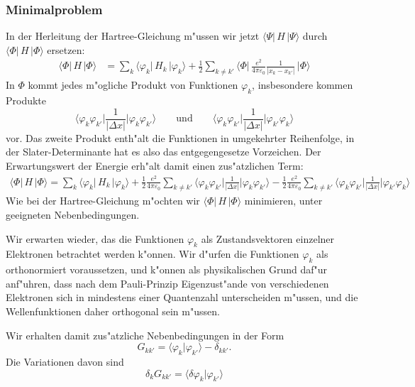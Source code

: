 \subsubsection{Minimalproblem}
In der Herleitung der Hartree-Gleichung m"ussen wir jetzt
$\langle\Psi|\,H\,|\Psi\rangle$ 
durch
$\langle\Phi|\,H\,|\Phi\rangle$ 
ersetzen:
\begin{align*}
\langle\Phi|\,H\,|\Phi\rangle
&=
\sum_k\langle\varphi_k|\,H_k\,|\varphi_k\rangle
+
\frac12
\sum_{k\ne k'}\biggl\langle\Phi\biggl|\,
\frac{e^2}{4\pi\varepsilon_0}
\frac{1}{|x_k-x_{k'}|}
\,\biggr|\Phi\biggr\rangle
\end{align*}
In $\Phi$ kommt jedes m"ogliche Produkt von Funktionen $\varphi_k$,
insbesondere kommen Produkte
\[
\biggl\langle\varphi_k\varphi_{k'}\biggr|
\frac{1}{|\Delta x|}
\biggl|\varphi_k\varphi_{k'}\biggr\rangle
\qquad\text{und}\qquad
\biggl\langle\varphi_k\varphi_{k'}\biggr|
\frac{1}{|\Delta x|}
\biggl|\varphi_{k'}\varphi_k\biggr\rangle
\]
vor.
Das zweite Produkt enth"alt die Funktionen in umgekehrter Reihenfolge,
in der Slater-Deter\-minante hat es also das entgegengesetze Vorzeichen.
Der Erwartungswert der Energie erh"alt damit einen zus"atzlichen Term:
\begin{align*}
\langle\Phi|\,H\,|\Phi\rangle
=
\sum_k\langle\varphi_k|\,H_k\,|\varphi_k\rangle
+
\frac12
\frac{e^2}{4\pi\varepsilon_0}
\sum_{k\ne k'}
\biggl\langle\varphi_k\varphi_{k'}\biggr|
\frac{1}{|\Delta x|}
\biggl|\varphi_k\varphi_{k'}\biggr\rangle
-
\frac12
\frac{e^2}{4\pi\varepsilon_0}
\sum_{k\ne k'}
\biggl\langle\varphi_k\varphi_{k'}\biggr|
\frac{1}{|\Delta x|}
\biggl|\varphi_{k'}\varphi_k\biggr\rangle
\end{align*}
Wie bei der Hartree-Gleichung m"ochten wir
$\langle\Phi|\,H\,|\Phi\rangle$ 
minimieren, unter geeigneten Nebenbedingungen.

Wir erwarten wieder, das die Funktionen $\varphi_k$ als Zustandsvektoren
einzelner Elektronen betrachtet werden k"onnen.
Wir d"urfen die Funktionen $\varphi_k$ als orthonormiert voraussetzen,
und k"onnen als physikalischen Grund daf"ur anf"uhren, dass
nach dem Pauli-Prinzip Eigenzust"ande
von verschiedenen Elektronen sich in mindestens einer Quantenzahl
unterscheiden m"ussen, und die Wellenfunktionen daher orthogonal
sein m"ussen.

Wir erhalten damit zus"atzliche Nebenbedingungen in der Form
\[
G_{kk'}=\langle\varphi_k|\varphi_{k'}\rangle-\delta_{kk'}.
\]
Die Variationen davon sind
\[
\delta_k G_{kk'}
=
\langle\delta\varphi_k |\varphi_{k'}\rangle
\]

